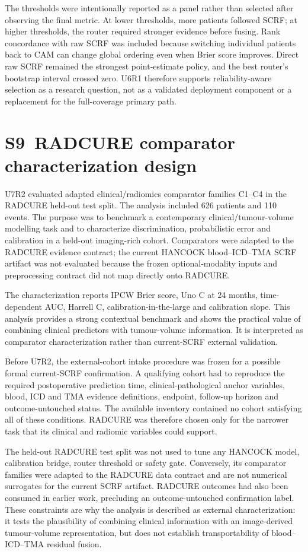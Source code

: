 \documentclass[pdflatex,sn-nature]{sn-jnl}
\begin{document}
The thresholds were intentionally reported as a panel rather than selected after observing the final metric. At lower thresholds, more patients followed SCRF; at higher thresholds, the router required stronger evidence before fusing. Rank concordance with raw SCRF was included because switching individual patients back to CAM can change global ordering even when Brier score improves. Direct raw SCRF remained the strongest point-estimate policy, and the best router's bootstrap interval crossed zero. U6R1 therefore supports reliability-aware selection as a research question, not as a validated deployment component or a replacement for the full-coverage primary path.

\section*{S9~RADCURE comparator characterization design}
U7R2 evaluated adapted clinical/radiomics comparator families C1--C4 in the RADCURE held-out test split. The analysis included 626 patients and 110 events. The purpose was to benchmark a contemporary clinical/tumour-volume modelling task and to characterize discrimination, probabilistic error and calibration in a held-out imaging-rich cohort. Comparators were adapted to the RADCURE evidence contract; the current HANCOCK blood--ICD--TMA SCRF artifact was not evaluated because the frozen optional-modality inputs and preprocessing contract did not map directly onto RADCURE.

The characterization reports IPCW Brier score, Uno C at 24 months, time-dependent AUC, Harrell C, calibration-in-the-large and calibration slope. This analysis provides a strong contextual benchmark and shows the practical value of combining clinical predictors with tumour-volume information. It is interpreted as comparator characterization rather than current-SCRF external validation.

Before U7R2, the external-cohort intake procedure was frozen for a possible formal current-SCRF confirmation. A qualifying cohort had to reproduce the required postoperative prediction time, clinical-pathological anchor variables, blood, ICD and TMA evidence definitions, endpoint, follow-up horizon and outcome-untouched status. The available inventory contained no cohort satisfying all of these conditions. RADCURE was therefore chosen only for the narrower task that its clinical and radiomic variables could support.

The held-out RADCURE test split was not used to tune any HANCOCK model, calibration bridge, router threshold or safety gate. Conversely, its comparator families were adapted to the RADCURE data contract and are not numerical surrogates for the current SCRF artifact. RADCURE outcomes had also been consumed in earlier work, precluding an outcome-untouched confirmation label. These constraints are why the analysis is described as external characterization: it tests the plausibility of combining clinical information with an image-derived tumour-volume representation, but does not establish transportability of blood--ICD--TMA residual fusion.
\end{document}
